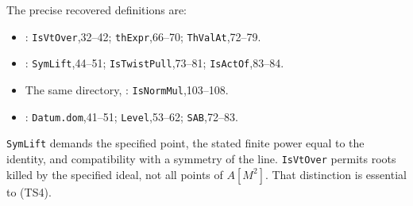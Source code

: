 The precise recovered definitions are:

\begin{itemize}
\item
  : \texttt{IsVtOver},32--42; \texttt{thExpr},66--70; \texttt{ThValAt},72--79.
\item
  : \texttt{SymLift},44--51; \texttt{IsTwistPull},73--81; \texttt{IsActOf},83--84.
\item
  The same directory, : \texttt{IsNormMul},103--108.
\item
  : \texttt{Datum.dom},41--51; \texttt{Level},53--62; \texttt{SAB},72--83.
\end{itemize}

\texttt{SymLift} demands the specified point, the stated finite power equal to the identity, and compatibility with a symmetry of the line. \texttt{IsVtOver} permits roots killed by the specified ideal, not all points of \(A[M^2]\). That distinction is essential to (TS4).

